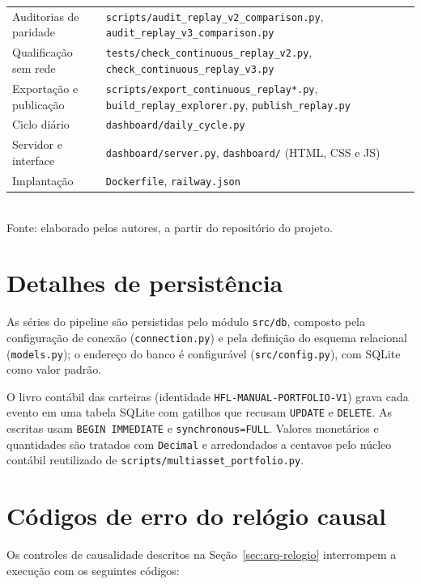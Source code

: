\begin{table}[htbp]
\begin{tabular}{>{\raggedright\arraybackslash}p{4.0cm} >{\raggedright\arraybackslash}p{11.0cm}}
Auditorias de paridade & \texttt{scripts/audit\_replay\_v2\_comparison.py}, \texttt{audit\_replay\_v3\_comparison.py} \\
Qualificação sem rede & \texttt{tests/check\_continuous\_replay\_v2.py}, \texttt{check\_continuous\_replay\_v3.py} \\
Exportação e publicação & \texttt{scripts/export\_continuous\_replay*.py}, \texttt{build\_replay\_explorer.py}, \texttt{publish\_replay.py} \\
Ciclo diário & \texttt{dashboard/daily\_cycle.py} \\
Servidor e interface & \texttt{dashboard/server.py}, \texttt{dashboard/} (HTML, CSS e JS) \\
Implantação & \texttt{Dockerfile}, \texttt{railway.json} \\
\bottomrule
\end{tabular}
\\[2pt]
{\footnotesize Fonte: elaborado pelos autores, a partir do repositório do projeto.}
\end{table}

\section{Detalhes de persistência}

As séries do pipeline são persistidas pelo módulo \texttt{src/db}, composto pela configuração de conexão (\texttt{connection.py}) e pela definição do esquema relacional (\texttt{models.py}); o endereço do banco é configurável (\texttt{src/config.py}), com SQLite como valor padrão.

O livro contábil das carteiras (identidade \texttt{HFL-MANUAL-PORTFOLIO-V1}) grava cada evento em uma tabela SQLite com gatilhos que recusam \texttt{UPDATE} e \texttt{DELETE}. As escritas usam \texttt{BEGIN IMMEDIATE} e \texttt{synchronous=FULL}. Valores monetários e quantidades são tratados com \texttt{Decimal} e arredondados a centavos pelo núcleo contábil reutilizado de \texttt{scripts/multiasset\_portfolio.py}.

\section{Códigos de erro do relógio causal}

Os controles de causalidade descritos na Seção~\ref{sec:arq-relogio} interrompem a execução com os seguintes códigos:

